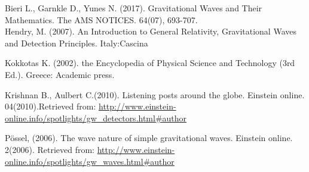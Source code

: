 \documentclass[11]{article}
\begin{document}
\vspace{10mm}
      
     \setlength{\parindent}{5ex} 
     
     \indent Bieri L., Garnkle D., Yunes N. (2017). Gravitational Waves and Their Mathematics. The AMS NOTICES. 64(07), 693-707.\\
    
    \vspace{5mm} 
          Hendry, M. (2007). An Introduction to General Relativity, Gravitational Waves and Detection Principles. Italy:Cascina
\vspace{5mm}
      
      Kokkotas K. (2002). the Encyclopedia of Physical Science and Technology (3rd Ed.). Greece: Academic press.

\vspace{5mm}
      Krishnan B., Aulbert C.(2010). Listening posts around the globe. Einstein online. 04(2010).Retrieved from: \url{http://www.einstein-online.info/spotlights/gw_detectors.html#author}
      
\vspace{5mm}
      Pössel, (2006).  The wave nature of simple gravitational waves. Einstein online. 2(2006). Retrieved from: \url{http://www.einstein-online.info/spotlights/gw_waves.html#author}
\end{document}
